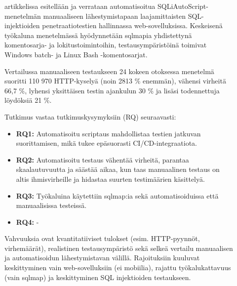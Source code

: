 \documentclass[bscthesis,finnish,oneside,biblatex]{uefcsthesis}
\begin{document}
    \begin{description}
        \item[\cite{raman2019_sqli}] artikkelissa esitellään ja verrataan automatisoitua SQLiAutoScript-menetelmän manuaaliseen lähestymistapaan laajamittaisten SQL-injektioiden penetraatiotestien hallinnassa web-sovelluksissa. Keskeisenä työkaluna menetelmässä hyödynnetään sqlmapia yhdistettynä komentosarja- ja lokitustoimintoihin, testausympäristöinä toimivat Windows batch- ja Linux Bash -komentosarjat.

        Vertailussa manuaaliseen testaukseen 24 kokeen otoksessa menetelmä suoritti 110 970 HTTP-kyselyä (noin 2813 \% enemmän), vähensi virheitä 66,7 \%, lyhensi yksittäisen testin ajankulun 30 \% ja lisäsi todennettuja löydöksiä 21 \%.

        Tutkimus vastaa tutkimuskysymyksiin (RQ) seuraavasti:
        \begin{itemize}
            \item \textbf{RQ1:} Automatisoitu scriptaus mahdollistaa testien jatkuvan suorittamisen, mikä tukee epäsuorasti CI/CD-integraatiota.
            \item \textbf{RQ2:} Automatisoitu testaus vähentää virheitä, parantaa skaalautuvuutta ja säästää aikaa, kun taas manuaalinen testaus on altis ihmisvirheille ja hidastaa suurten testimäärien käsittelyä.
            \item \textbf{RQ3:} Työkaluina käytettiin sqlmap:ia sekä automatisoiduissa että manuaalisissa testeissä.
            \item \textbf{RQ4:} -
        \end{itemize}

        Vahvuuksia ovat kvantitatiiviset tulokset (esim. HTTP-pyynnöt, virhemäärät), realistinen testausympäristö sekä selkeä vertailu manuaalisen ja automatisoidun lähestymistavan välillä. Rajoituksiin kuuluvat keskittyminen vain web-sovelluksiin (ei mobiilia), rajattu työkalukattavuus (vain sqlmap) ja keskittyminen SQL injektioiden testaukseen.
    \end{description}
\end{document}
